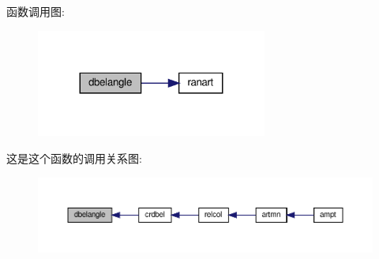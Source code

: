 函数调用图\+:
\nopagebreak
\begin{figure}[H]
\begin{center}
\leavevmode
\includegraphics[width=215pt]{dbelangle_8f90_ae9331c4b7145316a022e94893f6d3cad_cgraph}
\end{center}
\end{figure}
这是这个函数的调用关系图\+:
\nopagebreak
\begin{figure}[H]
\begin{center}
\leavevmode
\includegraphics[width=350pt]{dbelangle_8f90_ae9331c4b7145316a022e94893f6d3cad_icgraph}
\end{center}
\end{figure}
